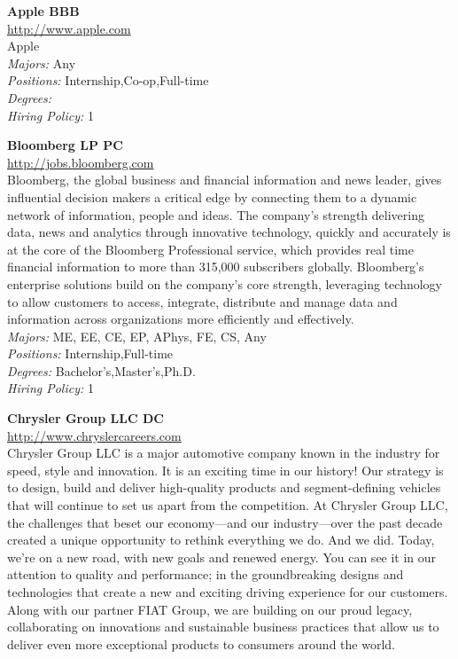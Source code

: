 \documentclass[twoside]{article}
\begin{document}
    \begin{center}\begin{multicols}{2}
    \begin{minipage}{.95\columnwidth}{\Large\bf Apple \hfill BBB}\\
    \url{http://www.apple.com}\\
    Apple\\
    \emph{Majors:} Any\\
    \emph{Positions:} Internship,Co-op,Full-time\\
    \emph{Degrees:} \\
    \emph{Hiring Policy:} 1\\
\end{minipage}
 \begin{minipage}{.95\columnwidth}{\Large\bf Bloomberg LP \hfill PC}\\
    \url{http://jobs.bloomberg.com}\\
    Bloomberg, the global business and financial information and news leader, gives influential decision makers a critical edge by connecting them to a dynamic network of information, people and ideas. The company's strength delivering data, news and analytics through innovative technology, quickly and accurately is at the core of the Bloomberg Professional service, which provides real time financial information to more than 315,000 subscribers globally. Bloomberg's enterprise solutions build on the company's core strength, leveraging technology to allow customers to access, integrate, distribute and manage data and information across organizations more efficiently and effectively.\\
    \emph{Majors:} ME, EE, CE, EP, APhys, FE, CS, Any\\
    \emph{Positions:} Internship,Full-time\\
    \emph{Degrees:} Bachelor's,Master's,Ph.D.\\
    \emph{Hiring Policy:} 1\\
\end{minipage}
 \begin{minipage}{.95\columnwidth}{\Large\bf Chrysler Group LLC \hfill DC}\\
    \url{http://www.chryslercareers.com}\\
    Chrysler Group LLC is a major automotive company known in the industry for speed, style and innovation. It is an exciting time in our history! Our strategy is to design, build and deliver high-quality products and segment-defining vehicles that will continue to set us apart from the competition. At Chrysler Group LLC, the challenges that beset our economy—and our industry—over the past decade created a unique opportunity to rethink everything we do. And we did. Today, we’re on a new road, with new goals and renewed energy. You can see it in our attention to quality and performance; in the groundbreaking designs and technologies that create a new and exciting driving experience for our customers. Along with our partner FIAT Group, we are building on our proud legacy, collaborating on innovations and sustainable business practices that allow us to deliver even more exceptional products to consumers around the world.\\

\end{minipage}
\end{multicols}
\end{center}
\end{document}
